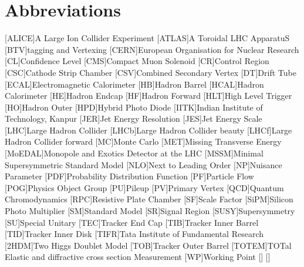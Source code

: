 \chapter {Abbreviations}
\begin{center}
\begin{acronym}
        [ALICE]{A Large Ion Collider Experiment}
        [ATLAS]A Toroidal LHC ApparatuS{}
        [BTV]{\PQb tagging and Vertexing}
        [CERN]{European Organisation for Nuclear Research}
        [CL]{Confidence Level}
        [CMS]{Compact Muon Solenoid}
        [CR]{Control Region}
        [CSC]{Cathode Strip Chamber}
        [CSV]{Combined Secondary Vertex}
        [DT]{Drift Tube}
        [ECAL]{Electromagnetic Calorimeter}
        [HB]{Hadron Barrel}
        [HCAL]{Hadron Calorimeter}
        [HE]{Hadron Endcap}
        [HF]{Hadron Forward}
        [HLT]{High Level Trigger}
        [HO]{Hadron Outer}
        [HPD]{Hybrid Photo Diode}
        [IITK]{Indian Institute of Technology, Kanpur}
        [JER]{Jet Energy Resolution}
        [JES]{Jet Energy Scale}
        [LHC]{Large Hadron Collider}
        [LHCb]{Large Hadron Collider beauty}
        [LHCf]{Large Hadron Collider forward}
        [MC]{Monte Carlo}
        [MET]{Missing Transverse Energy}
        [MoEDAL]{Monopole and Exotics Detector at the LHC}
        [MSSM]{Minimal Supersymmetric Standard Model}
        [NLO]{Next to Leading Order}
        [NP]{Nuisance Parameter}
        [PDF]{Probability Distribution Function}
        [PF]{Particle Flow}
        [POG]{Physics Object Group}
        [PU]{Pileup}
        [PV]{Primary Vertex}
        [QCD]{Quantum Chromodynamics}
        [RPC]{Resistive Plate Chamber}
        [SF]{Scale Factor}
        [SiPM]{Silicon Photo Multiplier}
        [SM]{Standard Model}
        [SR]{Signal Region}
        [SUSY]{Supersymmetry}
        [SU]{Special Unitary}
        [TEC]{Tracker End Cap}
        [TIB]{Tracker Inner Barrel}
        [TID]{Tracker Inner Disk}
	[TIFR]{Tata Institute of Fundamental Research}
        [2HDM]{Two Higgs Doublet Model}
        [TOB]{Tracker Outer Barrel}
        [TOTEM]{TOTal Elastic and diffractive cross section Measurement}
        [WP]{Working Point}
        \acro{}[]{}
        \acro{}[]{}
\end{acronym}
\end{center}


